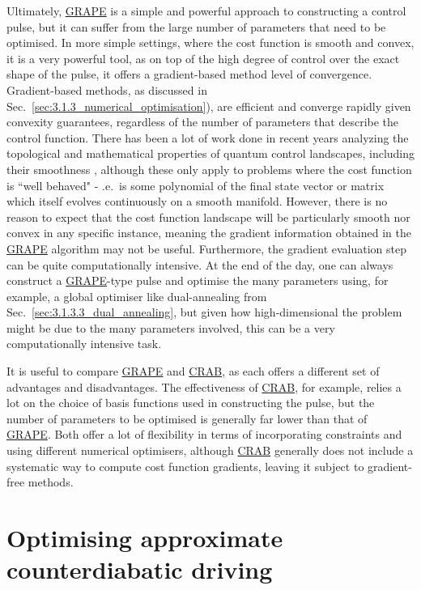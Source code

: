 \documentclass[a4paper,oneside,11pt]{book}
\newcommand{\acrref}[1]{\hyperref[acr:#1]{#1}}
\begin{document}
Ultimately, \acrref{GRAPE} is a simple and powerful approach to constructing a control pulse, but it can suffer from the large number of parameters that need to be optimised. In more simple settings, where the cost function is smooth and convex, it is a very powerful tool, as on top of the high degree of control over the exact shape of the pulse, it offers a gradient-based method level of convergence. Gradient-based methods, as discussed in Sec.~\ref{sec:3.1.3_numerical_optimisation}), are efficient and converge rapidly given convexity guarantees, regardless of the number of parameters that describe the control function. There has been a lot of work done in recent years analyzing the topological and mathematical properties of quantum control landscapes, including their smoothness \cite{chakrabarti_quantum_2007, rabitz_surprising_2023,dong_quantum_2022}, although these only apply to problems where the cost function is ``well behaved" - \@i.e.~is some polynomial of the final state vector or matrix which itself evolves continuously on a smooth manifold.  However, there is no reason to expect that the cost function landscape will be particularly smooth nor convex in any specific instance, meaning the gradient information obtained in the \acrref{GRAPE} algorithm may not be useful. Furthermore, the gradient evaluation step can be quite computationally intensive. At the end of the day, one can always construct a \acrref{GRAPE}-type pulse and optimise the many parameters using, for example, a global optimiser like dual-annealing from Sec.~\ref{sec:3.1.3.3_dual_annealing}, but given how high-dimensional the problem might be due to the many parameters involved, this can be a very computationally intensive task.

It is useful to compare \acrref{GRAPE} and \acrref{CRAB}, as each offers a different set of advantages and disadvantages. The effectiveness of \acrref{CRAB}, for example, relies a lot on the choice of basis functions used in constructing the pulse, but the number of parameters to be optimised is generally far lower than that of \acrref{GRAPE}. Both offer a lot of flexibility in terms of incorporating constraints and using different numerical optimisers, although \acrref{CRAB} generally does not include a systematic way to compute cost function gradients, leaving it subject to gradient-free methods. 
\part{Optimising approximate counterdiabatic driving}\label{part:COLD}
\end{document}
